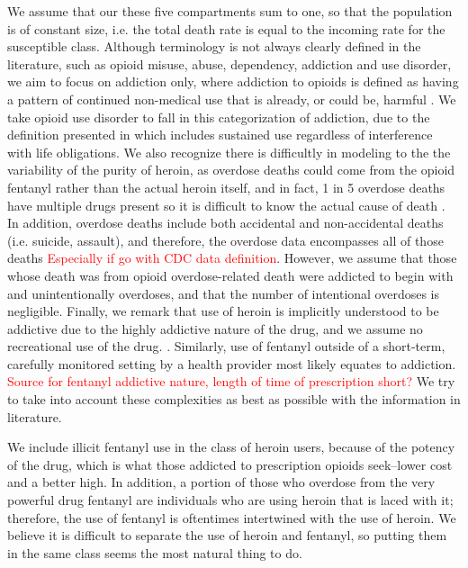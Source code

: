 \documentclass[12pt]{article}
\begin{document}
We assume that our these five compartments sum to one, so that the population is of constant size, i.e. the total death rate is equal to the incoming rate for the susceptible class. Although terminology is not always clearly defined in the literature, such as opioid misuse, abuse, dependency, addiction and use disorder, we aim to focus on addiction only, where addiction to opioids is defined as having a pattern of continued non-medical use that is already, or could be, harmful \cite{Vowles}. We take opioid use disorder to fall in this categorization of addiction, due to the definition presented in \cite{SAMSHA2} which includes sustained use regardless of interference with life obligations. We also recognize there is difficultly in modeling to the the variability of the purity of heroin, as overdose deaths could come from the opioid fentanyl rather than the actual heroin itself, and in fact, 1 in 5 overdose deaths have multiple drugs present so it is difficult to know the actual cause of death \cite{CDC4}. In addition, overdose deaths include both accidental and non-accidental deaths (i.e. suicide, assault), and therefore, the overdose data encompasses all of those deaths \textcolor{red}{Especially if go with CDC data definition}.
However, we assume that those whose death was from opioid overdose-related death were addicted to begin with and unintentionally overdoses, and that the number of intentional overdoses is negligible. Finally, we remark that use of heroin is implicitly understood to be addictive due to the highly addictive nature of the drug, and we assume no recreational use of the drug. \cite{NIH1}. Similarly, use of fentanyl outside of a short-term, carefully monitored setting by a health provider most likely equates to addiction. \textcolor{red}{Source for fentanyl addictive nature, length of time of prescription short?} We try to take into account these complexities as best as possible with the information in literature.



We include illicit fentanyl use in the class of heroin users, because of the potency of the drug, which is what those addicted to prescription opioids seek--lower cost and a better high. In addition, a portion of those who overdose from the very powerful drug fentanyl are individuals who are using heroin that is laced with it; therefore, the use of fentanyl is oftentimes intertwined with the use of heroin. We believe it is difficult to separate the use of heroin and fentanyl, so putting them in the same class seems the most natural thing to do. 
\end{document}
